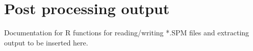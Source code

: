 \section{Post processing output\label{sec:postprocessing}}

Documentation for R functions for reading/writing {*}.SPM files and
extracting output to be inserted here. 


